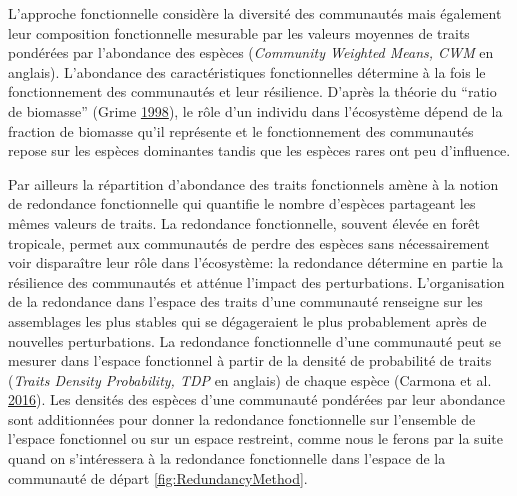 \documentclass[11pt,french,A4paper,extrafontsizes,onecolumn,openright]{memoir}
\begin{document}
L'approche fonctionnelle considère la diversité des communautés mais
également leur composition fonctionnelle mesurable par les valeurs
moyennes de traits pondérées par l'abondance des espèces
(\emph{Community Weighted Means, CWM} en anglais). L'abondance des
caractéristiques fonctionnelles détermine à la fois le fonctionnement
des communautés et leur résilience. D'après la théorie du ``ratio de
biomasse'' (Grime \protect\hyperlink{ref-Grime1998}{1998}), le rôle d'un
individu dans l'écosystème dépend de la fraction de biomasse qu'il
représente et le fonctionnement des communautés repose sur les espèces
dominantes tandis que les espèces rares ont peu d'influence.

Par ailleurs la répartition d'abondance des traits fonctionnels amène à
la notion de redondance fonctionnelle qui quantifie le nombre d'espèces
partageant les mêmes valeurs de traits. La redondance fonctionnelle,
souvent élevée en forêt tropicale, permet aux communautés de perdre des
espèces sans nécessairement voir disparaître leur rôle dans
l'écosystème: la redondance détermine en partie la résilience des
communautés et atténue l'impact des perturbations. L'organisation de la
redondance dans l'espace des traits d'une communauté renseigne sur les
assemblages les plus stables qui se dégageraient le plus probablement
après de nouvelles perturbations. La redondance fonctionnelle d'une
communauté peut se mesurer dans l'espace fonctionnel à partir de la
densité de probabilité de traits (\emph{Traits Density Probability, TDP}
en anglais) de chaque espèce (Carmona et al.
\protect\hyperlink{ref-Carmona2016}{2016}). Les densités des espèces
d'une communauté pondérées par leur abondance sont additionnées pour
donner la redondance fonctionnelle sur l'ensemble de l'espace
fonctionnel ou sur un espace restreint, comme nous le ferons par la
suite quand on s'intéressera à la redondance fonctionnelle dans l'espace
de la communauté de départ \ref{fig:RedundancyMethod}.
\end{document}
